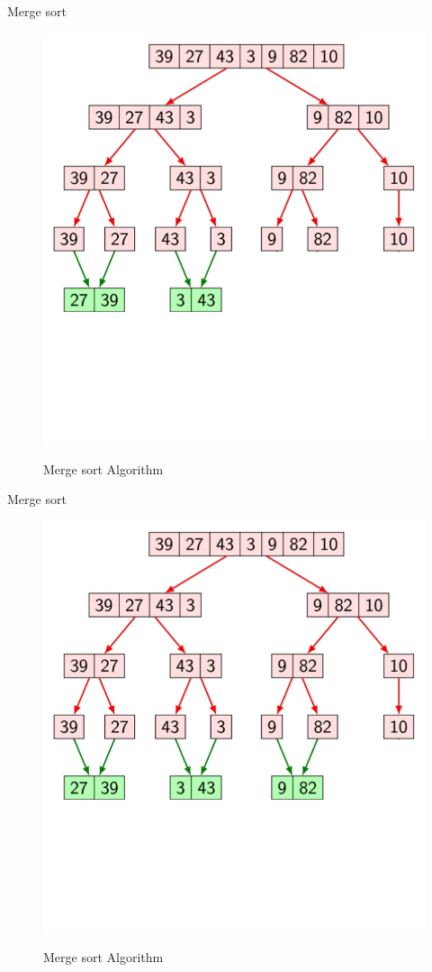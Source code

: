 \documentclass{beamer}
\begin{document}
\begin{frame}{Merge sort}
	\begin{figure}[h]
		\centering
		\includegraphics[scale=0.24]{IKEHS10.jpg}
		\label{fig:2}
		\caption{Merge sort Algorithm}
	\end{figure}
\end{frame}

\begin{frame}{Merge sort}
	\begin{figure}[h]
		\centering
		\includegraphics[scale=0.24]{IKEHS11.jpg}
		\label{fig:2}
		\caption{Merge sort Algorithm}
	\end{figure}
\end{frame}
\end{document}
